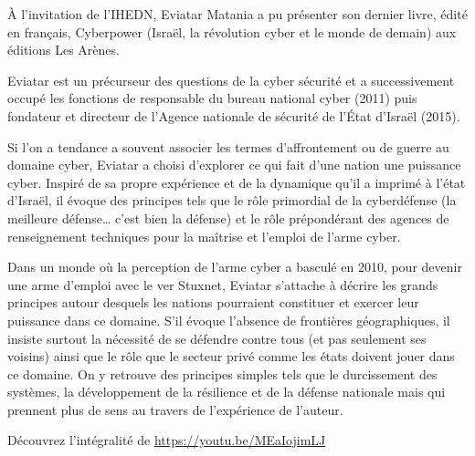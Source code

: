 À l’invitation de l’IHEDN, Eviatar Matania a pu présenter son dernier livre, édité en français, Cyberpower (Israël, la révolution cyber et le monde de demain) aux éditions Les Arènes.

Eviatar est un précurseur des questions de la cyber sécurité et a successivement occupé les fonctions de responsable du bureau national cyber (2011) puis fondateur et directeur de l’Agence nationale de sécurité de l’État d’Israël (2015).

Si l’on a tendance a souvent associer les termes d’affrontement ou de guerre au domaine cyber, Eviatar a choisi d’explorer ce qui fait d’une nation une puissance cyber. Inspiré de sa propre expérience et de la dynamique qu’il a imprimé à l’état d’Israël, il évoque des principes tels que le rôle primordial de la cyberdéfense (la meilleure défense… c’est bien la défense) et le rôle prépondérant des agences de renseignement techniques pour la maîtrise et l’emploi de l’arme cyber.

Dans un monde où la perception de l’arme cyber a basculé en 2010, pour devenir une arme d’emploi avec le ver Stuxnet, Eviatar s’attache à décrire les grands principes autour desquels les nations pourraient constituer et exercer leur puissance dans ce domaine. S’il évoque l’absence de frontières géographiques, il insiste surtout la nécessité de se défendre contre tous (et pas seulement ses voisins) ainsi que le rôle que le secteur privé comme les états doivent jouer dans ce domaine. On y retrouve des principes simples tels que le durcissement des systèmes, la développement de la résilience et de la défense nationale mais qui prennent plus de sens au travers de l’expérience de l’auteur.

Découvrez l'intégralité de \href{la conférence ici}{https://youtu.be/MEaIojimLJ}


